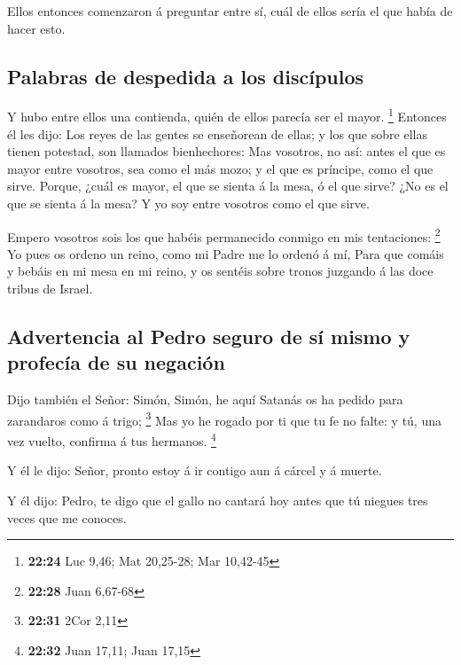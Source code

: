  Ellos entonces comenzaron á preguntar entre sí, cuál de
ellos sería el que había de hacer esto.

\hypertarget{palabras-de-despedida-a-los-discuxedpulos}{%
\subsection{Palabras de despedida a los
discípulos}\label{palabras-de-despedida-a-los-discuxedpulos}}

 Y hubo entre ellos una contienda, quién de ellos parecía
ser el mayor. \footnote{\textbf{22:24} Luc 9,46; Mat 20,25-28; Mar
  10,42-45}  Entonces él les dijo: Los reyes de las
gentes se enseñorean de ellas; y los que sobre ellas tienen potestad,
son llamados bienhechores:  Mas vosotros, no así: antes
el que es mayor entre vosotros, sea como el más mozo; y el que es
príncipe, como el que sirve.  Porque, ¿cuál es mayor, el
que se sienta á la mesa, ó el que sirve? ¿No es el que se sienta á la
mesa? Y yo soy entre vosotros como el que sirve.

 Empero vosotros sois los que habéis permanecido conmigo
en mis tentaciones: \footnote{\textbf{22:28} Juan 6,67-68}
 Yo pues os ordeno un reino, como mi Padre me lo ordenó á
mí,  Para que comáis y bebáis en mi mesa en mi reino, y
os sentéis sobre tronos juzgando á las doce tribus de Israel.

\hypertarget{advertencia-al-pedro-seguro-de-suxed-mismo-y-profecuxeda-de-su-negaciuxf3n}{%
\subsection{Advertencia al Pedro seguro de sí mismo y profecía de su
negación}\label{advertencia-al-pedro-seguro-de-suxed-mismo-y-profecuxeda-de-su-negaciuxf3n}}

 Dijo también el Señor: Simón, Simón, he aquí Satanás os
ha pedido para zarandaros como á trigo; \footnote{\textbf{22:31} 2Cor
  2,11}  Mas yo he rogado por ti que tu fe no falte: y
tú, una vez vuelto, confirma á tus hermanos. \footnote{\textbf{22:32}
  Juan 17,11; Juan 17,15}

 Y él le dijo: Señor, pronto estoy á ir contigo aun á
cárcel y á muerte.

 Y él dijo: Pedro, te digo que el gallo no cantará hoy
antes que tú niegues tres veces que me conoces.

